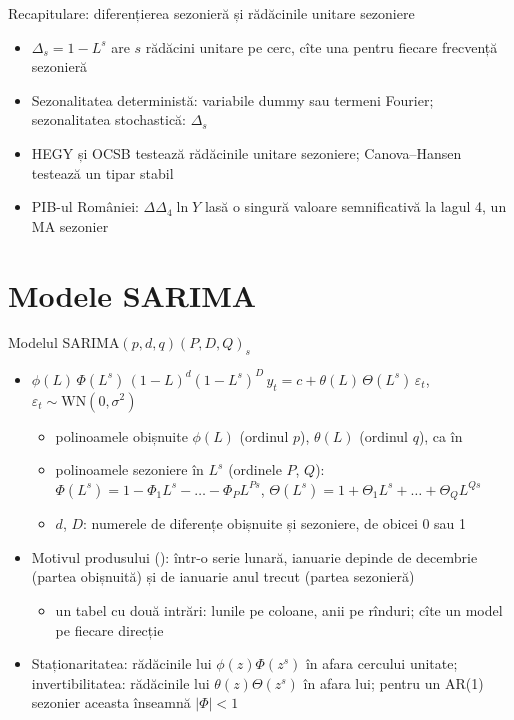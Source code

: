 \begin{frame}{Recapitulare: diferențierea sezonieră și rădăcinile unitare sezoniere}
\itemsize{\small}
\begin{itemize}
    \item $\Delta_s = 1 - L^s$ are $s$ rădăcini unitare pe cerc, cîte una pentru fiecare frecvență sezonieră
    \item Sezonalitatea deterministă: variabile dummy sau termeni Fourier; sezonalitatea stochastică: $\Delta_s$
    \item HEGY și OCSB testează rădăcinile unitare sezoniere; Canova--Hansen testează un tipar stabil
    \item PIB-ul României: $\Delta\Delta_4\ln Y$ lasă o singură valoare semnificativă la lagul 4, un MA sezonier
\end{itemize}
\end{frame}


\section{Modele SARIMA}

\begin{frame}{Modelul SARIMA$(p,d,q)(P,D,Q)_s$}
\itemsize{\small}
\begin{itemize}
    \item $\phi(L)\,\Phi(L^s)\,(1 - L)^d(1 - L^s)^D\,y_t = c + \theta(L)\,\Theta(L^s)\,\varepsilon_t$, $\varepsilon_t \sim \mathrm{WN}(0, \sigma^2)$
    \begin{itemize}
        \item polinoamele obișnuite $\phi(L)$ (ordinul $p$), $\theta(L)$ (ordinul $q$), ca în 
        \item polinoamele sezoniere în $L^s$ (ordinele $P$, $Q$): $\Phi(L^s) = 1 - \Phi_1L^s - \dots - \Phi_PL^{Ps}$, $\Theta(L^s) = 1 + \Theta_1L^s + \dots + \Theta_QL^{Qs}$
        \item $d$, $D$: numerele de diferențe obișnuite și sezoniere, de obicei 0 sau 1
    \end{itemize}
    \item Motivul produsului (): într-o serie lunară, ianuarie depinde de decembrie (partea obișnuită) și de ianuarie anul trecut (partea sezonieră)
    \begin{itemize}
        \item un tabel cu două intrări: lunile pe coloane, anii pe rînduri; cîte un model pe fiecare direcție
    \end{itemize}
    \item Staționaritatea: rădăcinile lui $\phi(z)\Phi(z^s)$ în afara cercului unitate; invertibilitatea: rădăcinile lui $\theta(z)\Theta(z^s)$ în afara lui; pentru un AR(1) sezonier aceasta înseamnă $|\Phi| < 1$
\end{itemize}
\end{frame}

